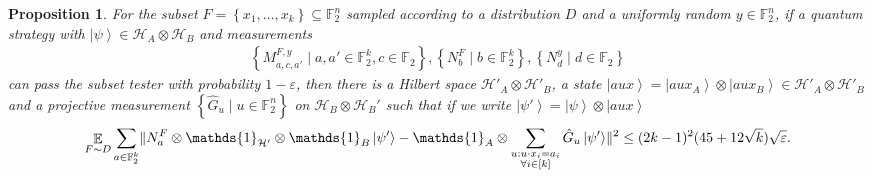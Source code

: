 \documentclass[11pt]{article}
\theoremstyle{plain}
\newtheorem{prop}[theorem]{Proposition}
\theoremstyle{definition}
\newcommand {\set} [1] {\ensuremath{ \left\lbrace #1 \right\rbrace }}
\DeclarePairedDelimiter{\norm}{\lVert}{\rVert}
\newcommand {\ket} [1] {\ensuremath{ \left| #1 \right\rangle }}
\DeclareMathOperator*{\bigE}{\mathbb{E}}
\newcommand {\id} {\ensuremath{\mathds{1}}}
\newcommand{\ep} {\ensuremath{\varepsilon}}
\newcommand{\x}{\otimes}
\newcommand{\calH}{\mathcal{H}}
\newcommand{\1}{\mathbb{1}} %
\newcommand{\bF}{\mathbb{F}}
\begin{document}
\begin{prop}
	\label{prop:subset_test}
    For the subset $F = \set{x_1,\ldots,x_k} \subseteq \bF_2^n$ sampled according to a distribution $D$ and a uniformly random $y \in \bF_2^n$, 
	if a quantum strategy with $\ket{\psi} \in \calH_A \x \calH_B$ and measurements
	\begin{align*}
	\set{ M^{F,y}_{a, c, a'} \mid a,a' \in \bF_2^k, c \in \bF_2}, \set{N^F_b \mid b \in \bF_2^k}, \set{ N^y_d \mid d \in \bF_2 }
	\end{align*}
	can pass the subset tester with probability $1 - \ep$, then there is a Hilbert space $\calH'_A \x \calH'_B$,
	a state $\ket{aux} = \ket{aux_A} \x \ket{aux_B} \in \calH'_A \x \calH'_B$ and a projective measurement $\set{ \hat{G}_u \mid u \in \bF_2^n }$
	on $\calH_B \x \calH_B'$
	such that if we write $\ket{\psi'} = \ket{\psi} \x \ket{aux}$
	\begin{align*}
		\bigE_{F \sim D} \sum_{a \in \bF_2^k} \norm{ N^F_a \x \id_{\calH'} \x \id_B \ket{\psi'} - \id_A \x \sum_{\substack{u: u\cdot x_i = a_i\\\forall i \in [k]}} \hat{G}_u \ket{\psi'}}^2 \leq  (2k-1)^2 (45+ 12\sqrt{k}) \sqrt{\ep}. 
	\end{align*}
\end{prop}
\end{document}

